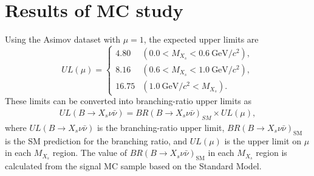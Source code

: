 \section{Results of MC study}
Using the Asimov dataset with $\mu=1$, the expected upper limits are
\begin{equation}
    UL(\mu) = 
  \begin{cases}
    4.80 & (0.0 < M_{X_{s}} < 0.6~\textrm{GeV}/c^{2}), \\[10pt]
    8.16 & (0.6 < M_{X_{s}} < 1.0~\textrm{GeV}/c^{2}), \\[10pt]
    16.75 & (1.0~\textrm{GeV}/c^{2} < M_{X_{s}}).
  \end{cases}
\end{equation}
These limits can be converted into branching-ratio upper limits as
\begin{align}
    UL(B\rightarrow X_{s}\nu \bar{\nu}) = BR(B\rightarrow X_{s}\nu \bar{\nu})_{SM} \times UL(\mu),
\end{align}
where $UL(B\rightarrow X_{s}\nu \bar{\nu})$ is the branching-ratio upper limit, $BR(B\rightarrow X_{s}\nu \bar{\nu})_{\mathrm{SM}}$ is the SM prediction for the branching ratio, and $UL(\mu)$ is the upper limit on $\mu$ in each $M_{X_{s}}$ region.
The value of $BR(B\rightarrow X_{s}\nu \bar{\nu})_{\mathrm{SM}}$ in each $M_{X_{s}}$ region is calculated from the signal MC sample based on the Standard Model.

